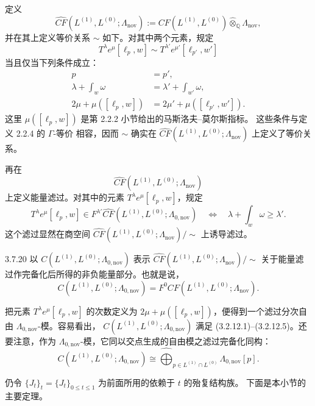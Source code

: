 定义
\[
 \widehat{CF}(L^{(1)},L^{(0)};\Lambda_{\mathrm{nov}})
 :=CF(L^{(1)},L^{(0)})
   \widehat\otimes_{\mathbb Q}\Lambda_{\mathrm{nov}},
\]
并在其上定义等价关系 $\sim$ 如下。对其中两个元素，规定
\[
 T^\lambda e^\mu[\ell_p,w]\sim
 T^{\lambda'}e^{\mu'}[\ell_{p'},w']
\]
当且仅当下列条件成立：
\begin{align}
 p&=p',
 \tag{3.7.19.1}\label{eq:3-7-19-1}\\
 \lambda+\int_w\omega
 &=\lambda'+\int_{w'}\omega,
 \tag{3.7.19.2}\label{eq:3-7-19-2}\\
 2\mu+\mu([\ell_p,w])
 &=2\mu'+\mu([\ell_{p'},w']).
 \tag{3.7.19.3}\label{eq:3-7-19-3}
\end{align}
这里 $\mu([\ell_p,w])$ 是第 2.2.2 小节给出的马斯洛夫--莫尔斯指标。
这些条件与定义 2.2.4 的 $\Gamma$-等价
相容，因而 $\sim$ 确实在
$\widehat{CF}(L^{(1)},L^{(0)};\Lambda_{\mathrm{nov}})$ 上定义了等价关系。

再在
\[
 \widehat{CF}(L^{(1)},L^{(0)};\Lambda_{\mathrm{nov}})
\]
上定义能量滤过。对其中的元素 $T^\lambda e^\mu[\ell_p,w]$，规定
\[
 T^\lambda e^\mu[\ell_p,w]\in
 F^{\lambda'}
 \widehat{CF}(L^{(1)},L^{(0)};\Lambda_{0,\mathrm{nov}})
 \quad\Longleftrightarrow\quad
 \lambda+\int_w\omega\geq\lambda'.
\]
这个滤过显然在商空间
$\widehat{CF}(L^{(1)},L^{(0)};\Lambda_{\mathrm{nov}})/\sim$ 上诱导滤过。

\begin{definition}{3.7.20}\label{def:3-7-20}
以 $C(L^{(1)},L^{(0)};\Lambda_{0,\mathrm{nov}})$ 表示
$\widehat{CF}(L^{(1)},L^{(0)};\Lambda_{\mathrm{nov}})/\sim$
关于能量滤过作完备化后所得的非负能量部分。也就是说，
\[
 C(L^{(1)},L^{(0)};\Lambda_{0,\mathrm{nov}})
 =F^0CF(L^{(1)},L^{(0)};\Lambda_{\mathrm{nov}}).
\]
\end{definition}

把元素 $T^\lambda e^\mu[\ell_p,w]$ 的次数定义为
$2\mu+\mu([\ell_p,w])$，便得到一个滤过分次自由
$\Lambda_{0,\mathrm{nov}}$-模。容易看出，
$C(L^{(1)},L^{(0)};\Lambda_{0,\mathrm{nov}})$ 满足
(3.2.12.1)--(3.2.12.5)。还要注意，作为
$\Lambda_{0,\mathrm{nov}}$-模，它同以交点生成的自由模之滤过完备化同构：
\[
 C(L^{(1)},L^{(0)};\Lambda_{0,\mathrm{nov}})
 \cong
 \widehat{\bigoplus}_{p\in L^{(1)}\cap L^{(0)}}
 \Lambda_{0,\mathrm{nov}}[p].
\]

仍令 $\{J_t\}_t=\{J_t\}_{0\leq t\leq1}$ 为前面所用的依赖于 $t$ 的殆复结构族。
下面是本小节的主要定理。

